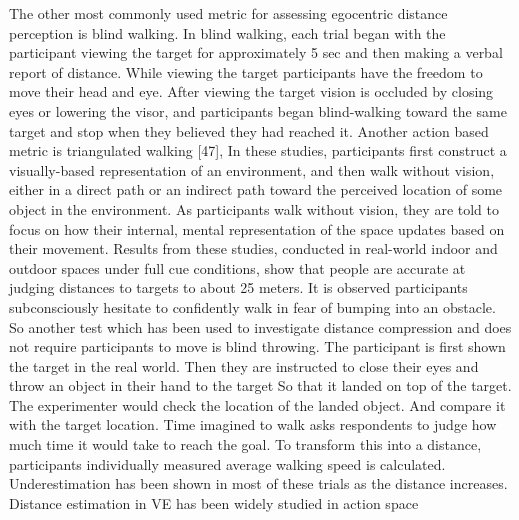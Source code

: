 The other most commonly used metric for assessing egocentric distance perception is blind walking. In blind walking, each trial began with the participant viewing the target for approximately 5 sec and then making a verbal report of distance. While viewing the target participants have the freedom to move their head and eye. After viewing the target vision is occluded by closing eyes or lowering the visor, and participants began blind-walking toward the same target and stop when they believed they had reached it\cite{phillips2009distance}. 
Another action based metric is triangulated walking [47], In these studies, participants first construct a visually-based representation of an environment, and then walk without vision, either in a direct path or an indirect path toward the perceived location of some object in the environment\cite{grechkin2010does}. As participants walk without vision, they are told to focus on how their internal, mental representation of the space updates based on their movement. Results from these studies, conducted in real-world indoor and outdoor spaces under full cue conditions, show that people are accurate at judging distances to targets to about 25 meters\cite{willemsen2004effects}. 
It is observed participants subconsciously hesitate to confidently walk in fear of bumping into an obstacle. So another test which has been used to investigate distance compression and does not require participants to move is blind throwing\cite{sahm2005throwing}. The participant is first shown the target in the real world. Then they are instructed to close their eyes and throw an object in their hand to the target So that it landed on top of the target. The experimenter would check the location of the landed object. And compare it with the target location.
Time imagined to walk asks respondents to judge how much time it would take to reach the goal. To transform this into a distance, participants individually measured average walking speed is calculated\cite{plumert2005distance}.
Underestimation has been shown in most of these trials as the distance increases. Distance estimation in VE has been widely studied in action space 

